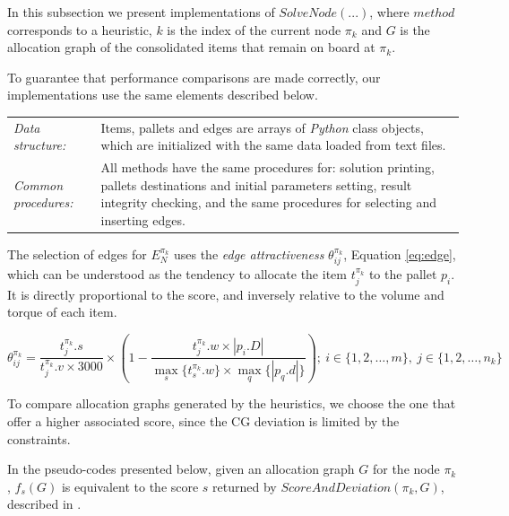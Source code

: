 \documentclass[preprint,authoryear]{elsarticle}
\begin{document}
In this subsection we present implementations of $SolveNode(...)$, where $method$\/ corresponds to a heuristic, $k$\/ is the index of the current node $\pi_k$ and $G$\/ is the allocation graph of the consolidated items that remain on board at $\pi_k$.

To guarantee that performance comparisons are made correctly, our implementations use the same elements described below.


\bgroup
\def\arraystretch{1.2}
\begin{table}[H]
	\centering
	\small
	\begin{tabular}{CD}
		
		{\it Data structure:}     & Items, pallets and edges are arrays of \emph{Python} class objects, which are initialized with the same data loaded from text files. \\
				
		{\it Common procedures:}  & All methods have the same procedures for: solution printing, pallets destinations and initial parameters setting, result integrity checking, and the same procedures for selecting and inserting edges.\\

	\end{tabular}
	\normalsize
\end{table}
\egroup

The selection of edges for $E_N^{\pi_k}$\/ uses the {\it edge attractiveness}\/ $\theta^{\pi_k}_{ij}$, Equation \ref{eq:edge}, which can be understood as the tendency to allocate the item $t^{\pi_k}_j$\/ to the pallet $p_i$. It is directly proportional to the score, and inversely relative to the volume and torque of each item. 

\begin{equation} \label{eq:edge}
	\theta^{\pi_k}_{ij}= \frac{t^{\pi_k}_j.s}{t^{\pi_k}_j.v \times 3000}\times(1-\frac{t^{\pi_k}_j.w\times|p_i.D|}{\max_s\{t^{\pi_k}_s.w\}\times\max_q\{|p_q.d|\}});\ i \in \{1,2,\ldots,m\},\ j \in \{1,2,\ldots,n_k\}
\end{equation} 

To compare allocation graphs generated by the heuristics, we choose the one that offer a higher associated score, since the CG deviation is limited by the constraints.

In the pseudo-codes presented below, given an allocation graph $G$\/ for the node $\pi_k$, $f_s(G)$\/ is equivalent to the score $s$\/ returned by $ScoreAndDeviation({\pi_k},G) $, described in \cite{MesquitaSanches2023}.
\end{document}
